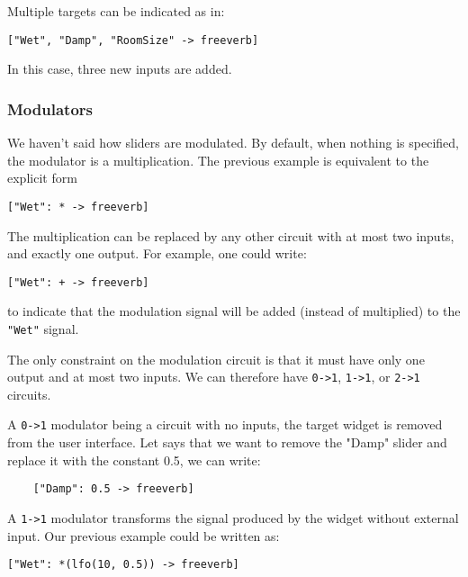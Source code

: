 Multiple targets can be indicated as in: 

\begin{lstlisting}
["Wet", "Damp", "RoomSize" -> freeverb]
\end{lstlisting}

In this case, three new inputs are added. 

\subsubsection{Modulators}

We haven't said how sliders are modulated. By default, when nothing is specified, the modulator is a multiplication. The previous example is equivalent to the explicit form 

\begin{lstlisting}
["Wet": * -> freeverb]
\end{lstlisting}

The multiplication can be replaced by any other circuit with at most two inputs, and exactly one output. For example, one could write:

\begin{lstlisting}
["Wet": + -> freeverb]
\end{lstlisting}

to indicate that the modulation signal will be added (instead of multiplied) to the \lstinline`"Wet"` signal.

The only constraint on the modulation circuit is that it must have only one output and at most two inputs. We can therefore have \lstinline`0->1`, \lstinline`1->1`, or \lstinline`2->1` circuits. 

A \lstinline`0->1` modulator being a circuit with no inputs, the target widget is removed from the user interface. Let says that we want to remove the "Damp" slider and replace it with the constant 0.5, we can write:

\begin{lstlisting}
	["Damp": 0.5 -> freeverb]
\end{lstlisting}
	
A \lstinline`1->1` modulator transforms the signal produced by the widget without external input. Our previous example could be written as:

\begin{lstlisting}
["Wet": *(lfo(10, 0.5)) -> freeverb]
\end{lstlisting}

